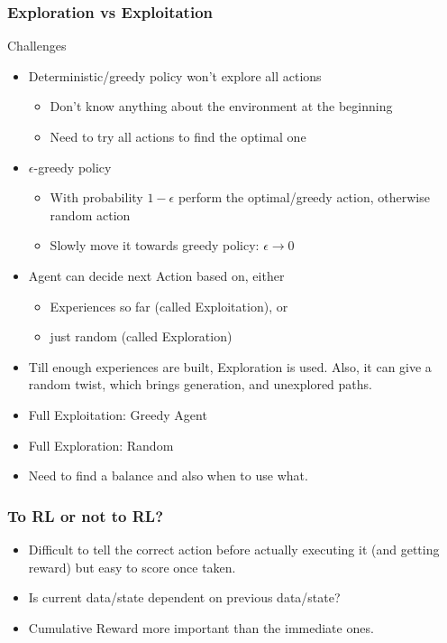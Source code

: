 \begin{frame}[fragile]\frametitle{Exploration vs Exploitation}

Challenges

\begin{itemize}
\item Deterministic/greedy policy won't explore all actions
	\begin{itemize}
	\item Don't know anything about the environment at the beginning
	\item Need to try all actions to find the optimal one
	\end{itemize}

\item $\epsilon$-greedy policy
	\begin{itemize}
	\item	With probability $1-\epsilon$ perform the optimal/greedy action, otherwise random action
	\item	Slowly move it towards greedy policy: $\epsilon \rightarrow 0$
	\end{itemize}
\item Agent can decide next Action based on, either
	\begin{itemize}
	\item Experiences so far (called Exploitation), or
	\item just random (called Exploration)
	\end{itemize}
\item Till enough experiences are built, Exploration is used. Also, it can give a random twist, which brings generation, and unexplored paths.
\item Full Exploitation: Greedy Agent
\item Full Exploration: Random
\item Need to find a balance and also when to use what.
\end{itemize}
\end{frame}


\begin{frame}[fragile]\frametitle{To RL or not to RL?}

\begin{itemize}
\item Difficult to tell the correct action before actually executing it (and getting reward) but easy to score once taken.
\item Is current data/state dependent on previous data/state?
\item Cumulative Reward more important than the immediate ones.
\end{itemize}
\end{frame}



